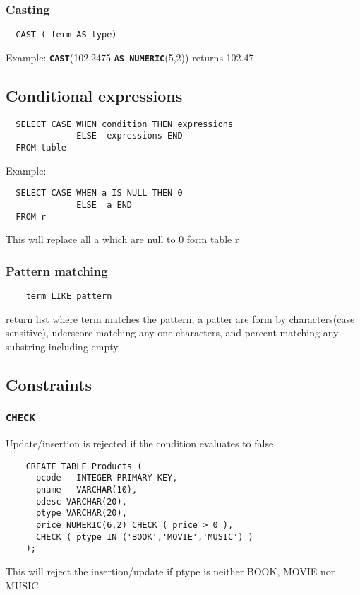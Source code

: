 \documentclass{article}
\begin{document}
\subsubsection*{Casting}
\begin{lstlisting}
  CAST ( term AS type)
\end{lstlisting}
Example: \texttt{\textbf{CAST}}(102,2475 \texttt{\textbf{AS NUMERIC}}(5,2)) returns 102.47

\subsection*{Conditional expressions}
\begin{lstlisting}
  SELECT CASE WHEN condition THEN expressions
              ELSE  expressions END
  FROM table
\end{lstlisting}
Example:
\begin{lstlisting}
  SELECT CASE WHEN a IS NULL THEN 0
              ELSE  a END
  FROM r
\end{lstlisting}
This will replace all a which are null to 0 form table r

\subsubsection*{Pattern matching}
\begin{lstlisting}
    term LIKE pattern
  \end{lstlisting}
return list where term matches the pattern, a patter are form by characters(case sensitive), uderscore matching any one characters, and percent matching any substring including empty


\subsection{Constraints}
\subsubsection*{\texttt{\textbf{CHECK}}}
Update/insertion is rejected if the condition evaluates to false

\begin{lstlisting}
    CREATE TABLE Products (
      pcode   INTEGER PRIMARY KEY,
      pname   VARCHAR(10),
      pdesc VARCHAR(20),
      ptype VARCHAR(20),
      price NUMERIC(6,2) CHECK ( price > 0 ),
      CHECK ( ptype IN ('BOOK','MOVIE','MUSIC') )
    );
  \end{lstlisting}
This will reject the insertion/update if ptype is neither BOOK, MOVIE nor MUSIC
\end{document}
